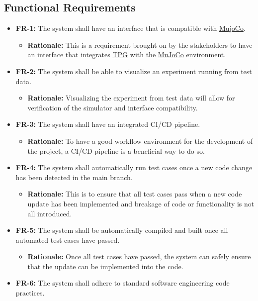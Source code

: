 \documentclass[12pt]{article}
\newcommand{\lips}{\textit{Insert your content here.}}
\begin{document}
\subsection{Functional Requirements}
\begin{itemize}
\item \textbf{FR-1:} The system shall have an interface that is compatible with \hyperref[def:mujoco]{MujoCo}.
  \begin{itemize}
    \item \textbf{Rationale:} This is a requirement brought on by the stakeholders to have an interface that integrates \hyperref[def:tpg]{TPG} with the \hyperref[def:mujoco]{MuJoCo} environment.
  \end{itemize}
\item \textbf{FR-2:} The system shall be able to visualize an experiment running from test data.
  \begin{itemize}
    \item \textbf{Rationale:} Visualizing the experiment from test data will allow for verification of the simulator and interface compatibility.
  \end{itemize}
\item \textbf{FR-3:} The system shall have an integrated CI/CD pipeline.
  \begin{itemize}
    \item \textbf{Rationale:} To have a good workflow environment for the development of the project, a CI/CD pipeline is a beneficial way to do so.
  \end{itemize}
\item \textbf{FR-4:} The system shall automatically run test cases once a new code change has been detected in the main branch.
  \begin{itemize}
    \item \textbf{Rationale:} This is to ensure that all test cases pass when a new code update has been implemented and breakage of code or functionality is not all introduced.
  \end{itemize}
\item \textbf{FR-5:} The system shall be automatically compiled and built once all automated test cases have passed.
  \begin{itemize}
    \item \textbf{Rationale:} Once all test cases have passed, the system can safely ensure that the update can be implemented into the code.
  \end{itemize}
\item \textbf{FR-6:} The system shall adhere to standard software engineering code practices.

\end{itemize}
\end{document}
